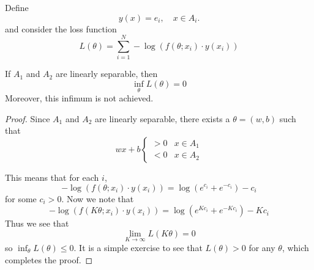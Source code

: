 Define 
$$
y(x)=e_i,\quad x\in A_i.
$$
and consider the loss function
\begin{equation}\label{logit_loss}
 L(\theta) = \displaystyle\sum_{i = 1}^N -\log\left(f(\theta;x_i)\cdot y(x_i)\right)
\end{equation}

\begin{lemma}\label{lemma116}
 If $A_1$ and $A_2$ are linearly separable, then 
 \begin{equation}
  \inf_{\theta} L(\theta) = 0
 \end{equation}
 Moreover, this infimum is not achieved.
\end{lemma}
\begin{proof}
 Since $A_1$ and $A_2$ are linearly separable, there exists a $\theta = (w,b)$ such that
 \begin{equation}
  wx+b
  \begin{cases}
   > 0 & x\in A_1 \\
   < 0 & x\in A_2
  \end{cases}
 \end{equation}

 This means that for each $i$, 
 $$-\log\left(f(\theta;x_i)\cdot y(x_i)\right) = \log(e^{c_i} + e^{-c_i}) - c_i$$
 for some $c_i > 0$. Now we note that
 $$-\log\left(f(K\theta;x_i)\cdot y(x_i)\right) = \log(e^{Kc_i} + e^{-Kc_i}) - Kc_i$$
 Thus we see that
 \begin{equation}
  \lim_{K\rightarrow \infty} L(K\theta) = 0
 \end{equation}
 so $\inf_{\theta} L(\theta) \leq 0$. It is a simple exercise to see that $L(\theta) > 0$
 for any $\theta$, which completes the proof.

\end{proof}
 
